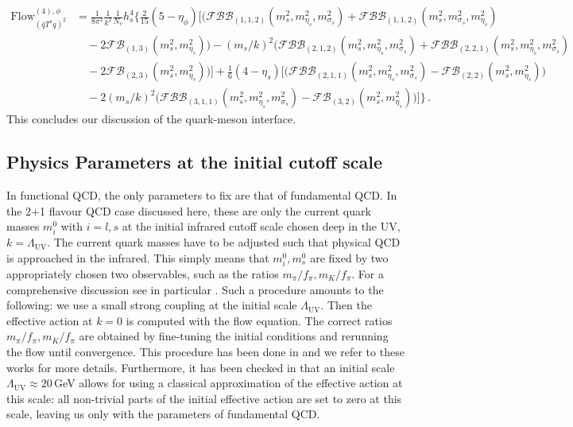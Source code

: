 \documentclass[reprint,twocolumn,superscriptaddress,preprintnumbers,amsmath,amssymb,aps,prd,floatfix]{revtex4-2}
\begin{document}
\begin{align}
{\text{Flow}}^{(4),\phi}_{(\bar q T^{s} q)^2}
&=\frac{1}{8\pi^2}\frac{1}{k^2}\frac{1}{N_c}
    {h}_{s}^{4}\bigg\{\frac{2}{15}(5-\eta_{\phi})\Big[\Big(\mathcal{FBB}_{(1,1,2)}(
    {m}_{s}^{2},{m}_{\eta_s}^{2},{m}_{\sigma_s}^{2})+\mathcal{FBB}_{(1,1,2)}({m}_{s}^{2},
    {m}_{\sigma_s}^{2},{m}_{\eta_s}^{2})\nonumber \\[1ex] 
&\quad-2\mathcal{FB}_{(1,3)}({m}_{s}^{2},
    {m}_{\eta_s}^{2})\Big)-({m}_{s}/k)^{2}\Big(
    \mathcal{FBB}_{(2,1,2)}({m}_{s}^{2},
    {m}_{\eta_s}^{2},m_{\sigma_s}^{2})
+\mathcal{FBB}_{(2,2,1)}({m}_{s}^{2},{m}_{\eta_s}^{2},
    {m}_{\sigma_s}^{2})\nonumber \\[1ex] 
&\quad-2\mathcal{FB}_{(2,3)}({m}_{s}^{2},{m}_{\eta_s}^{2})\Big)\Big]
    +\frac{1}{6}(4-\eta_{s})\Big[\Big(\mathcal{FBB}_{(2,1,1)}({m}_{s}^{2},
    {m}_{\eta_s}^{2},{m}_{\sigma_s}^{2})-\mathcal{FB}_{(2,2)}({m}_{s}^{2},{m}_{\eta_s}^{2})
    \Big)\nonumber \\[1ex] 
&\quad-2({m}_{s}/k)^{2}\Big(\mathcal{FBB}_{(3,1,1)}({m}_{s}^{2},
    {m}_{\eta_s}^{2},{m}_{\sigma_s}^{2})-\mathcal{FB}_{(3,2)}({m}_{s}^{2},{m}_{\eta_s}^{2})\Big)\Big]\bigg\}\,.
\end{align}
%
This concludes our discussion of the quark-meson interface.  


\subsection{Physics Parameters at the initial cutoff scale} 
\label{app:set-up}

In functional QCD, the only parameters to fix are that of fundamental QCD. In the 2+1 flavour QCD case discussed here, these are only the current quark masses $m_i^0$ with $i=l,s$ at the initial infrared cutoff scale chosen deep in the UV, $k=\Lambda_\textrm{UV}$. The current quark masses have to be adjusted such that physical QCD is approached in the infrared. This simply means that $m_i^0, m_s^0$ are fixed by two appropriately chosen two observables, such as the ratios $m_\pi/f_\pi, m_K/f_\pi$. For a comprehensive discussion see in particular \cite{Ihssen:2024miv, Fu:2025hcm}. Such a procedure amounts to the following: we use a small strong coupling at the initial scale $\Lambda_\textrm{UV}$. Then the effective action at $k=0$ is computed with the flow equation. The correct ratios $m_\pi/f_\pi, m_K/f_\pi$ are obtained by fine-tuning the initial conditions and rerunning the flow until convergence. This procedure has been done in \cite{Ihssen:2024miv, Fu:2025hcm} and we refer to these works for more details. Furthermore, it has been checked in \cite{Fu:2025hcm} that an initial scale  
$\Lambda_\textrm{UV}\approx 20$\,GeV allows for using a classical approximation of the effective action at this scale: all non-trivial parts of the initial effective action are set to zero at this scale, leaving us only with the parameters of fundamental QCD. 
\end{document}
